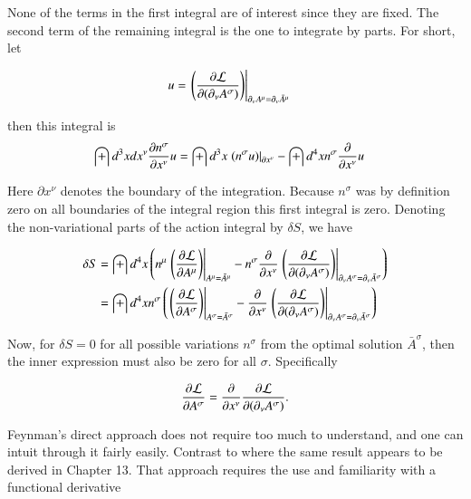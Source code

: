 \documentclass{article}
\newcommand{\barA}[0]{\bar{A}}
\begin{document}
None of the terms in the first integral are of interest since they are fixed.  The second term of the remaining integral is the one to integrate by
parts.  For short, let

\begin{align*}
u &= \left. \left( \PD{(\partial_\nu A^\sigma)}{\LL} \right) \right\vert_{\partial_\nu A^\mu = \partial_\nu \barA^\mu}
\end{align*}

then this integral is
\begin{align*}
\int d^3 x d x^\nu \PD{x^\nu}{n^\sigma} u 
&= \int d^3 x \left. \left( {n^\sigma} u \right) \right\vert_{\partial x^\nu} - \int d^4 x n^\sigma \PD{x^\nu}{} u
\end{align*}

Here $\partial x^\nu$ denotes the boundary of the integration.  Because $n^\sigma$ was by definition zero on all boundaries of the
integral region this first integral is zero.  Denoting the non-variational parts of the action integral by $\delta S$, we have

\begin{align*}
\delta S
&= \int d^4 x \left(
n^\mu \left. \left( \PD{A^\mu}{\LL} \right) \right\vert_{A^\mu = \barA^\mu} 
- n^\sigma \PD{x^\nu}{} \left. \left( \PD{(\partial_\nu A^\sigma)}{\LL} \right) \right\vert_{\partial_\nu A^\sigma = \partial_\nu \barA^\sigma}
\right) \\
&= \int d^4 x
n^\sigma
\left(
\left. \left( \PD{A^\sigma}{\LL} \right) \right\vert_{A^\sigma = \barA^\sigma} 
- \PD{x^\nu}{} \left. \left( \PD{(\partial_\nu A^\sigma)}{\LL} \right) \right\vert_{\partial_\nu A^\sigma = \partial_\nu \barA^\sigma}
\right)
\end{align*}

Now, for $\delta S = 0$ for all possible variations $n^\sigma$ from the optimal solution $\barA^\sigma$, then the inner expression must also be zero
for all $\sigma$.  Specifically

\begin{align}\label{eqn:eulerLagrangeField}
\PD{A^\sigma}{\LL} = \PD{x^\nu}{} \PD{(\partial_\nu A^\sigma)}{\LL}.
\end{align}

Feynman's direct approach does not require too much to understand, and one can intuit through it fairly easily.  Contrast to 
\cite{goldstein1951cm}
where the same result appears to be derived in Chapter 13.  That approach requires the use and familiarity with a functional derivative
\end{document}
